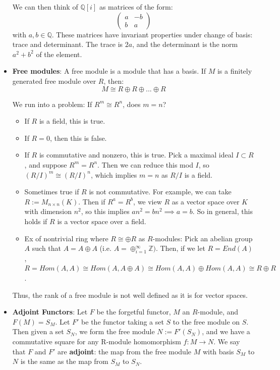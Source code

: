 \documentclass[11pt, oneside]{amsart}   	%
\theoremstyle{definition}
\begin{document}
\begin{itemize}
	We can then think of $\mathbb Q[i]$ as matrices of the form:
	$$
		\begin{pmatrix}
			a & -b \\ b & a
		\end{pmatrix}
	$$
	with $a, b\in \mathbb Q$. These matrices have invariant properties under change of basis: trace and determinant. The trace is $2a$, and the 
	determinant is the norm $a^2 + b^2$ of the element.
	
	\item \textbf{Free modules}: A free module is a module that has a basis. If $M$ is a finitely generated free module over $R$, then:
	$$
		M \cong R \oplus R\oplus ... \oplus R
	$$
	
	We run into a problem: If $R^m\cong R^n$, does $m = n$?
		
		\begin{itemize}
			
			\item If $R$ is a field, this is true.
			
			\item If $R = 0$, then this is false.
			
			\item If $R$ is commutative and nonzero, this is true. Pick a maximal ideal $I\subset R$, and suppose $R^m = R^n$. Then we can 
			reduce this mod $I$, so $(R/I)^m \cong (R/I)^n$, which implies $m = n$ as $R / I$ is a field.
			
			\item Sometimes true if $R$ is not commutative. For example, we can take $R := M_{n \times n}(K)$. Then if $R^a = R^b$, we view 
			$R$ as a vector space over $K$ with dimension $n^2$, so this implies $an^2 = bn^2\implies a = b$. So in general, this holds if $R$ is a 
			vector space over a field.
			
			\item Ex of nontrivial ring where $R\cong \oplus R$ as $R$-modules: Pick an abelian group $A$ such that $A = A\oplus A$ (i.e. 
			$A = \oplus_{i = 1}^\infty\mathbb Z)$. Then, if we let $R = End(A)$, $R = Hom(A, A)\cong Hom(A, A\oplus A)\cong Hom(A, A) 
			\oplus Hom(A, A) \cong R\oplus R$.
			
		\end{itemize}
	
	Thus, the rank of a free module is not well defined as it is for vector spaces.
	
	\item \textbf{Adjoint Functors}: Let $F$ be the forgetful functor, $M$ an $R$-module, and $F(M) = S_M$. Let $F'$ be the functor taking a set $S$ 
	to the free module on $S$. Then given a set $S_N$, we form the free module $N := F'(S_N)$, and we have a commutative square for any 
	R-module homomorphism $f: M\rightarrow N$. We say that $F$ and $F'$ are \textbf{adjoint}: the map from the free module $M$ with basis $S_M
	$ to $N$ is the same as the map from $S_M$ to $S_N$. 
	

\end{itemize}
\end{document}
